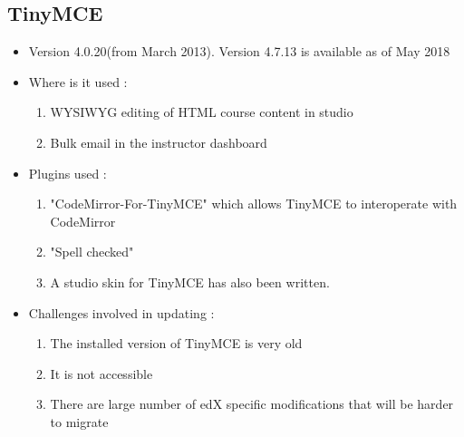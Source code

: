 \subsection{TinyMCE}
\begin{itemize}
	\item Version 4.0.20(from March 2013). Version 4.7.13 is available as of May 2018
	\item Where is it used :
		\begin{enumerate}
			\item WYSIWYG editing of HTML course content in studio
			\item Bulk email in the instructor dashboard
		\end{enumerate}
	\item Plugins used :
		\begin{enumerate}
			\item "CodeMirror-For-TinyMCE" which allows TinyMCE to interoperate with CodeMirror
			\item "Spell checked"
			\item A studio skin for TinyMCE has also been written.
		\end{enumerate}
	\item Challenges involved in updating :
		\begin{enumerate}
			\item The installed version of TinyMCE is very old
			\item It is not accessible
			\item There are large number of edX specific modifications that will be harder to migrate
		\end{enumerate}
\end{itemize}

